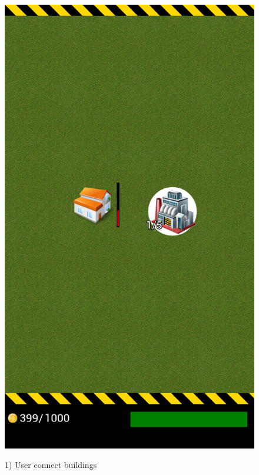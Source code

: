 \begin{figure}[H]
{			\includegraphics[scale=0.18]{pictures/sprint3-screen/buildPowerline_2.png}
		}
		\caption{1) User connect buildings}
	\end{figure}
